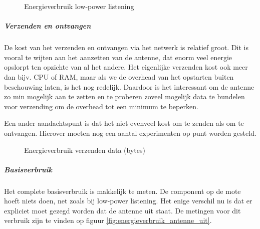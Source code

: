 \documentclass[11pt]{article}
\begin{document}
\begin{figure}[h]
\centering

\caption{Energieverbruik low-power listening}
\label{fig:energieverbruik_lpl}
\end{figure}


\subparagraph{Verzenden en ontvangen}

De kost van het verzenden en ontvangen via het netwerk is relatief groot. Dit is
vooral te wijten aan het aanzetten van de antenne, dat enorm veel energie
opslorpt ten opzichte van al het andere. Het eigenlijke verzenden kost ook meer
dan bijv. CPU of RAM, maar als we de overhead van het opstarten buiten
beschouwing laten, is het nog redelijk. Daardoor is het interessant om de
antenne zo min mogelijk aan te zetten en te proberen zoveel mogelijk data te
bundelen voor verzending om de overhead tot een minimum te beperken.

Een ander aandachtspunt is dat het niet evenveel kost om te zenden als om te
ontvangen. Hierover moeten nog een aantal experimenten op punt worden gesteld.

\begin{figure}[h]
\centering

\caption{Energieverbruik verzenden data (bytes)}
\label{fig:energieverbruik_ant}
\end{figure}

\subparagraph{Basisverbruik}

Het complete basisverbruik is makkelijk te meten. De component op de mote hoeft
niets doen, net zoals bij low-power listening. Het enige verschil nu is dat er
expliciet moet gezegd worden dat de antenne uit staat.
De metingen voor dit verbruik zijn te vinden op figuur \ref{fig:energieverbruik_antenne_uit}.
\end{document}

